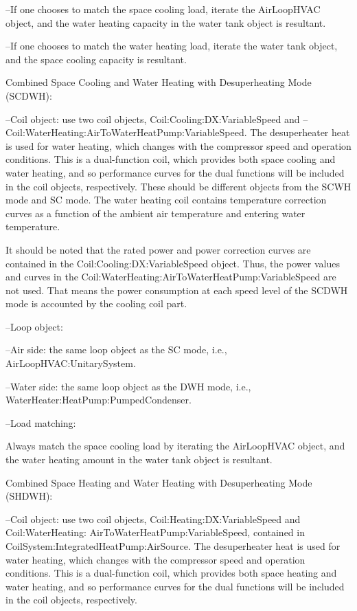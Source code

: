 --If one chooses to match the space cooling load, iterate the AirLoopHVAC object, and the water heating capacity in the water tank object is resultant.

--If one chooses to match the water heating load, iterate the water tank object, and the space cooling capacity is resultant.

Combined Space Cooling and Water Heating with Desuperheating Mode (SCDWH):

--Coil object: use two coil objects, Coil:Cooling:DX:VariableSpeed and -- Coil:WaterHeating:AirToWaterHeatPump:VariableSpeed. The desuperheater heat is used for water heating, which changes with the compressor speed and operation conditions. This is a dual-function coil, which provides both space cooling and water heating, and so performance curves for the dual functions will be included in the coil objects, respectively. These should be different objects from the SCWH mode and SC mode. The water heating coil contains temperature correction curves as a function of the ambient air temperature and entering water temperature. 

It should be noted that the rated power and power correction curves are contained in the Coil:Cooling:DX:VariableSpeed object. Thus, the power values and curves in the Coil:WaterHeating:AirToWaterHeatPump:VariableSpeed are not used. That means the power consumption at each speed level of the SCDWH mode is accounted by the cooling coil part. 

--Loop object: 

--Air side: the same loop object as the SC mode, i.e., AirLoopHVAC:UnitarySystem.

--Water side:  the same loop object as the DWH mode, i.e., WaterHeater:HeatPump:PumpedCondenser.

--Load matching: 

Always match the space cooling load by iterating the AirLoopHVAC object, and the water heating amount in the water tank object is resultant.

Combined Space Heating and Water Heating with Desuperheating Mode (SHDWH):

--Coil object: use two coil objects, Coil:Heating:DX:VariableSpeed and Coil:WaterHeating: AirToWaterHeatPump:VariableSpeed, contained in CoilSystem:IntegratedHeatPump:AirSource. The desuperheater heat is used for water heating, which changes with the compressor speed and operation conditions. This is a dual-function coil, which provides both space heating and water heating, and so performance curves for the dual functions will be included in the coil objects, respectively. 

